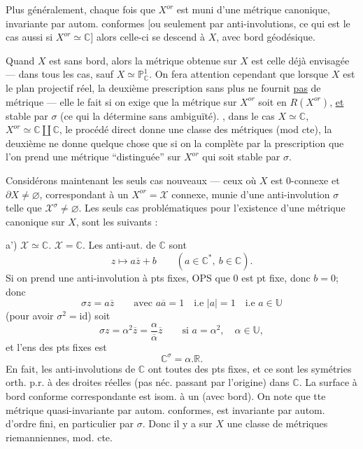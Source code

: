 Plus généralement, chaque fois que $X^{or}$ est muni d'une métrique canonique, invariante par autom. conformes [ou seulement par anti-involutions, ce qui est le cas aussi si $X^{or}\simeq\mathbb C$] alors celle-ci se descend à $X$, avec bord géodésique.

Quand $X$ est sans bord,  alors  la métrique obtenue sur $X$ est celle déjà envisagée ---   dans tous les cas, sauf $X\simeq\mathbb P^1_{\mathbb C}$. On fera attention cependant que lorsque $X$ est le plan projectif réel, la deuxième prescription sans plus ne fournit \uline{pas} de métrique --- elle le fait si on exige que la métrique sur $X^{or}$ soit en $R(X^{or})$, \uline{et} stable par $\sigma$ (ce qui la détermine sans ambiguïté).  , dans le cas $X\simeq\mathbb C$, $X^{or}\simeq\mathbb C\amalg\mathbb C$, le procédé direct donne une classe des métriques (mod cte), la deuxième
ne donne quelque chose que si on la complète par la prescription que l'on prend une métrique ``distinguée'' sur $X^{or}$ qui soit stable par $\sigma$.

Considérons maintenant les seuls cas nouveaux --- ceux où $X$ est 0-connexe et $\partial X\ne\varnothing$, correspondant à un $X^{or}=\mathcal X$ connexe, munie d'une anti-involution $\sigma$ telle que $\mathcal X^\sigma\ne\varnothing$. Les seuls cas problématiques pour l'existence d'une métrique canonique sur $X$, sont les suivants :

a') $\mathcal X\simeq\mathbb C$.   $\mathcal X=\mathbb C$. Les anti-aut. de $\mathbb C$ sont
\[
z\longmapsto a\overline z+b\qquad(a\in\mathbb C^*,\ b\in\mathbb C).
\]
Si on prend une anti-involution à pts fixes, OPS que 0 est pt fixe, donc $b=0$; donc 
\[
\sigma z=a\overline z\qquad\text{avec }a\overline a=1\quad\text{i.e }|a|=1\quad\text{i.e }a\in\mathbb U
\]
(pour avoir $\sigma^2=\mathrm{id}$) soit
\[
\sigma z=\alpha^2\overline z=\frac\alpha{\overline\alpha}\overline z\qquad\text{si }a=\alpha^2,\quad\alpha\in\mathbb U,
\]
et l'ens des pts fixes est
\[
\mathbb C^\sigma=\alpha.\mathbb R.
\]
En fait, les anti-involutions de $\mathbb C$ ont toutes des pts fixes, et ce sont les symétries orth. p.r. à des droites réelles (pas néc. passant par l'origine) dans $\mathbb C$. La surface à bord conforme correspondante est isom. à un  (avec bord). On note que tte métrique  quasi-invariante par autom. conformes, est invariante par autom. d'ordre fini, en particulier par $\sigma$. Donc il y a sur $X$ une classe  de métriques riemanniennes, mod. cte.

